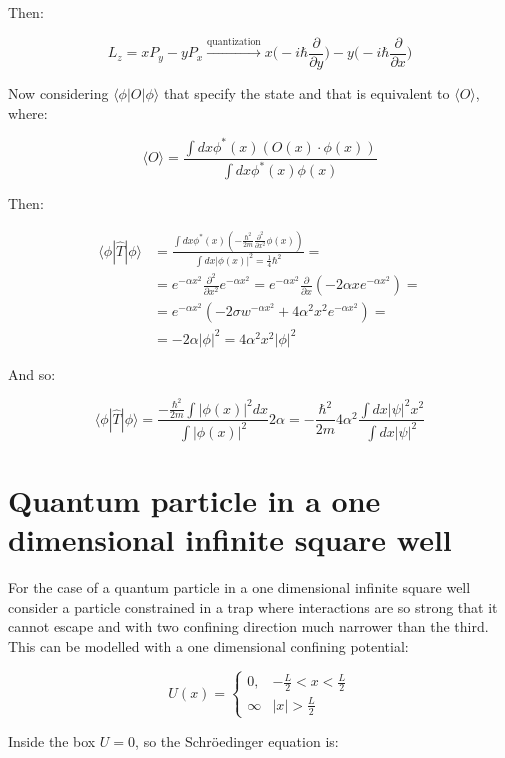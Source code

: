     Then:

    $$L_z = xP_y - yP_x\xrightarrow[]{\text{quantization}}x\biggl(-i\hbar\frac{\partial}{\partial y}\biggr) - y\biggl(-i\hbar\frac{\partial}{\partial x}\biggr)$$

    Now considering $\langle \phi|O|\phi\rangle$ that specify the state and that is equivalent to $\langle O\rangle$, where:

    $$\langle O\rangle = \frac{\int dx \phi^*(x)(O(x)\cdot\phi(x))}{\int dx\phi^*(x)\phi(x)}$$

    Then:

    \begin{align*}
      \langle\phi|\hat{T}|\phi\rangle &=\frac{\int dx\phi^*(x)(-\frac{\hbar^2}{2m}\frac{\partial^2}{\partial x^2}\phi(x))}{\int dx |\phi(x)|^2 = \frac{1}{4}\hbar^2}=\\
                                      &=e^{-\alpha x^2}\frac{\partial^2}{\partial x^2}e^{-\alpha x^2} = e^{-\alpha x^2}\frac{\partial}{\partial x}(-2\alpha xe^{-\alpha x^2}) =\\
                                      &=e^{-\alpha x^2}(-2\sigma w^{-\alpha x^2}+4\alpha^2x^2e^{-\alpha x^2})= \\
                                      &=-2\alpha|\phi|^2 = 4\alpha^2 x^2|\phi|^2
    \end{align*}

    And so:

    $$\langle\phi|\hat{T}|\phi\rangle = \frac{-\frac{\hbar^2}{2m}\int |\phi(x)|^2dx}{\int|\phi(x)|^2}2\alpha= - \frac{\hbar^2}{2m}4\alpha^2\frac{\int dx|\psi|^2x^2}{\int dx|\psi|^2}$$


\section{Quantum particle in a one dimensional infinite square well}
For the case of a quantum particle in a one dimensional infinite square well consider a particle constrained in a trap where interactions are so strong that it cannot escape and with two confining direction much narrower than the third.
This can be modelled with a one dimensional confining potential:

$$U(x) = \begin{cases} 0, &-\frac{L}{2}<x<\frac{L}{2}\\\infty &|x|>\frac{L}{2}\end{cases}$$

Inside the box $U=0$, so the Schr\"oedinger equation is:


